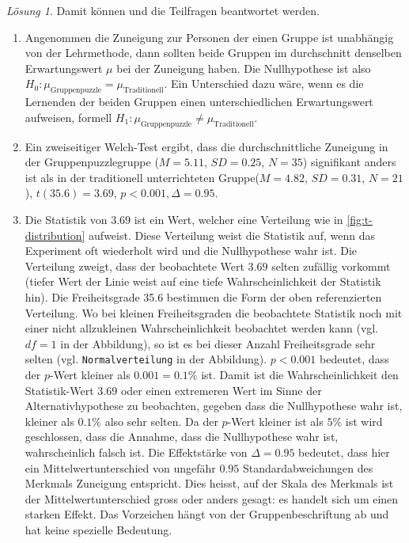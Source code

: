 \documentclass[
]{book}
\providecommand{\tightlist}{%
  \setlength{\itemsep}{0pt}\setlength{\parskip}{0pt}}
\theoremstyle{definition}
\theoremstyle{definition}
\theoremstyle{definition}
\theoremstyle{definition}
\theoremstyle{remark}
\newtheorem*{solution}{Lösung}
\begin{document}
\begin{solution}
Damit können und die Teilfragen beantwortet werden.

\begin{enumerate}
\def\labelenumi{\alph{enumi})}
\tightlist
\item
  Angenommen die Zuneigung zur Personen der einen Gruppe ist unabhängig von der Lehrmethode, dann sollten beide Gruppen im durchschnitt denselben Erwartungswert \(\mu\) bei der Zuneigung haben. Die Nullhypothese ist also \(H_0: \mu_\text{Gruppenpuzzle} = \mu_\text{Traditionell}\). Ein Unterschied dazu wäre, wenn es die Lernenden der beiden Gruppen einen unterschiedlichen Erwartungswert aufweisen, formell \(H_1: \mu_\text{Gruppenpuzzle} \neq \mu_\text{Traditionell}\).
\item
  Ein zweiseitiger Welch-Test ergibt, dass die durchschnittliche Zuneigung in der Gruppenpuzzlegruppe (\(M = 5.11\), \(SD = 0.25\), \(N = 35\)) signifikant anders ist als in der traditionell unterrichteten Gruppe(\(M = 4.82\), \(SD = 0.31\), \(N = 21\)), \(t(35.6) = 3.69\), \(p < 0.001, \Delta = 0.95\).
\item
  Die Statistik von \(3.69\) ist ein Wert, welcher eine Verteilung wie in \ref{fig:t-distribution} aufweist. Diese Verteilung weist die Statistik auf, wenn das Experiment oft wiederholt wird und die Nullhypothese wahr ist. Die Verteilung zweigt, dass der beobachtete Wert \(3.69\) selten zufällig vorkommt (tiefer Wert der Linie weist auf eine tiefe Wahrscheinlichkeit der Statistik hin). Die Freiheitsgrade 35.6 bestimmen die Form der oben referenzierten Verteilung. Wo bei kleinen Freiheitsgraden die beobachtete Statistik noch mit einer nicht allzukleinen Wahrscheinlichkeit beobachtet werden kann (vgl. \(df = 1\) in der Abbildung), so ist es bei dieser Anzahl Freiheitsgrade sehr selten (vgl. \texttt{Normalverteilung} in der Abbildung). \(p < 0.001\) bedeutet, dass der \(p\)-Wert kleiner als \(0.001 = 0.1\%\) ist. Damit ist die Wahrscheinlichkeit den Statistik-Wert \(3.69\) oder einen extremeren Wert im Sinne der Alternativhypothese zu beobachten, gegeben dass die Nullhypothese wahr ist, kleiner als \(0.1\%\) also sehr selten. Da der \(p\)-Wert kleiner ist als \(5\%\) ist wird geschlossen, dass die Annahme, dass die Nullhypothese wahr ist, wahrscheinlich falsch ist. Die Effektstärke von \(\Delta = 0.95\) bedeutet, dass hier ein Mittelwertunterschied von ungefähr \(0.95\) Standardabweichungen des Merkmals Zuneigung entspricht. Dies heisst, auf der Skala des Merkmals ist der Mittelwertunterschied gross oder anders gesagt: es handelt sich um einen starken Effekt. Das Vorzeichen hängt von der Gruppenbeschriftung ab und hat keine spezielle Bedeutung.
\end{enumerate}

\end{solution}
\end{document}
